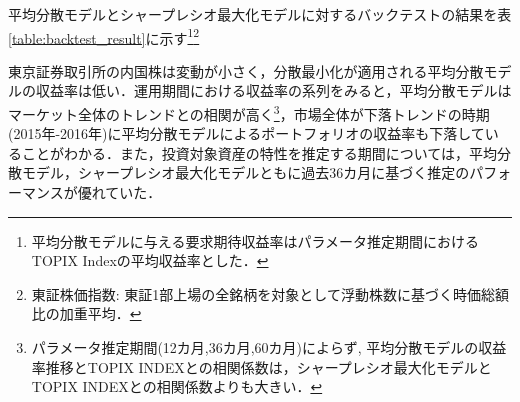 \documentclass[dvipdfmx,autodetect-engine]{jsarticle}
\begin{document}
平均分散モデルとシャープレシオ最大化モデルに対するバックテストの結果を表\ref{table:backtest_result}に示す\footnote{平均分散モデルに与える要求期待収益率はパラメータ推定期間におけるTOPIX Indexの平均収益率とした．}\footnote{東証株価指数: 東証1部上場の全銘柄を対象として浮動株数に基づく時価総額比の加重平均．}

東京証券取引所の内国株は変動が小さく，分散最小化が適用される平均分散モデルの収益率は低い．運用期間における収益率の系列をみると，平均分散モデルはマーケット全体のトレンドとの相関が高く\footnote{パラメータ推定期間(12カ月,36カ月,60カ月)によらず,
平均分散モデルの収益率推移とTOPIX INDEXとの相関係数は，シャープレシオ最大化モデルとTOPIX INDEXとの相関係数よりも大きい．}，市場全体が下落トレンドの時期(2015年-2016年)に平均分散モデルによるポートフォリオの収益率も下落していることがわかる．また，投資対象資産の特性を推定する期間については，平均分散モデル，シャープレシオ最大化モデルともに過去36カ月に基づく推定のパフォーマンスが優れていた．

\end{document}
